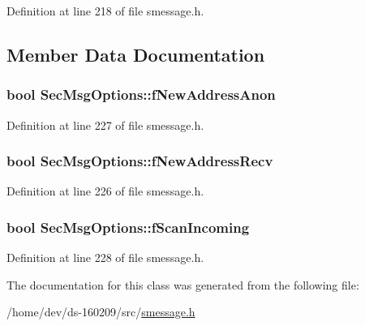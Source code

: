 Definition at line 218 of file smessage.\+h.



\subsection{Member Data Documentation}
\hypertarget{class_sec_msg_options_a1c385b931d2cf0c43c228dd3e6fc42b2}{}
\subsubsection[{f\+New\+Address\+Anon}]{\setlength{\rightskip}{0pt plus 5cm}bool Sec\+Msg\+Options\+::f\+New\+Address\+Anon}\label{class_sec_msg_options_a1c385b931d2cf0c43c228dd3e6fc42b2}


Definition at line 227 of file smessage.\+h.

\hypertarget{class_sec_msg_options_ae9e4dac2327a288f33b95319ea8730da}{}
\subsubsection[{f\+New\+Address\+Recv}]{\setlength{\rightskip}{0pt plus 5cm}bool Sec\+Msg\+Options\+::f\+New\+Address\+Recv}\label{class_sec_msg_options_ae9e4dac2327a288f33b95319ea8730da}


Definition at line 226 of file smessage.\+h.

\hypertarget{class_sec_msg_options_ab6112d8ce04dd74987daaee636da15fa}{}
\subsubsection[{f\+Scan\+Incoming}]{\setlength{\rightskip}{0pt plus 5cm}bool Sec\+Msg\+Options\+::f\+Scan\+Incoming}\label{class_sec_msg_options_ab6112d8ce04dd74987daaee636da15fa}


Definition at line 228 of file smessage.\+h.



The documentation for this class was generated from the following file\+:\begin{DoxyCompactItemize}
\item 
/home/dev/ds-\/160209/src/\hyperlink{smessage_8h}{smessage.\+h}\end{DoxyCompactItemize}
